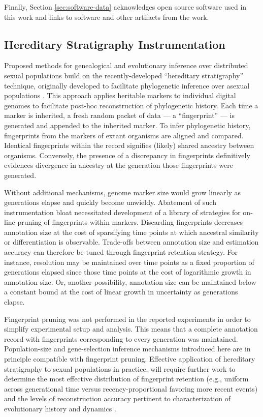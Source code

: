 Finally, Section \ref{sec:software-data} acknowledges open source software used in this work and links to software and other artifacts from the work.

\subsection{Hereditary Stratigraphy Instrumentation}
\label{sec:instrumentation}




Proposed methods for genealogical and evolutionary inference over distributed sexual populations build on the recently-developed ``hereditary stratigraphy'' technique, originally developed to facilitate phylogenetic inference over asexual populations \citep{moreno2022hstrat}.
This approach applies heritable markers to individual digital genomes to facilitate post-hoc reconstruction of phylogenetic history.
Each time a marker is inherited, a fresh random packet of data --- a ``fingerprint'' --- is generated and appended to the inherited marker.
To infer phylogenetic history, fingerprints from the markers of extant organisms are aligned and compared.
Identical fingerprints within the record signifies (likely) shared ancestry between organisms.
Conversely, the presence of a discrepancy in fingerprints definitively evidences divergence in ancestry at the generation those fingerprints were generated.

Without additional mechanisms, genome marker size would grow linearly as generations elapse and quickly become unwieldy.
Abatement of such instrumentation bloat necessitated development of a library of strategies for on-line pruning of fingerprints within markers.
Discarding fingerprints decreases annotation size at the cost of sparsifying time points at which  ancestral similarity or differentiation is observable.
Trade-offs between annotation size and estimation accuracy can therefore be tuned through fingerprint retention strategy.
For instance, resolution may be maintained over time points as a fixed proportion of generations elapsed since those time points at the cost of logarithmic growth in annotation size.
Or, another possibility, annotation size can be maintained below a constant bound at the cost of linear growth in uncertainty as generations elapse.

Fingerprint pruning was not performed in the reported experiments in order to simplify experimental setup and analysis.
This means that a complete annotation record with fingerprints corresponding to every generation was maintained.
Population-size and gene-selection inference mechanisms introduced here are in principle compatible with fingerprint pruning.
Effective application of hereditary stratigraphy to sexual populations in practice, will require further work to determine the most effective distribution of fingerprint retention (e.g., uniform across generational time versus recency-proportional favoring more recent events) and the levels of reconstruction accuracy pertinent to characterization of evolutionary history and dynamics \citep{moreno2023toward}.

